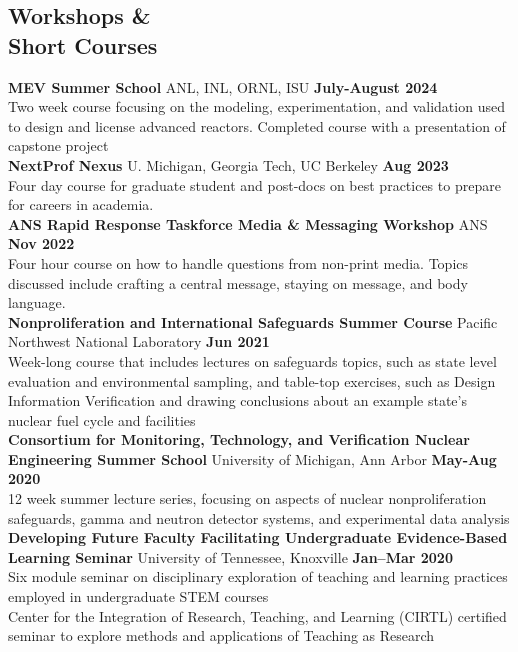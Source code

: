 \documentclass[margin,line]{resume}
\begin{document}
\begin{resume}
    \section{\mysidestyle Workshops \&\\Short Courses}
    \textbf{MEV Summer School} ANL, INL, ORNL, ISU \hfill \textbf{July-August 2024}\\
    Two week course focusing on the modeling, experimentation, and 
    validation used to design and license advanced reactors. Completed 
    course with a presentation of capstone project \\
    \textbf{NextProf Nexus} 
    U. Michigan, Georgia Tech, UC Berkeley \hfill \textbf{Aug 2023}\\
    Four day course for graduate student and post-docs on best practices to prepare for careers in 
    academia. \\
    \textbf{ANS Rapid Response Taskforce Media \& Messaging Workshop} 
    ANS \hfill \textbf{Nov 2022}\\
    Four hour course on how to handle questions from non-print media. Topics discussed 
    include crafting a central message, staying on message, and body language. \\
    \textbf{Nonproliferation and International Safeguards Summer Course} 
    Pacific Northwest National Laboratory \hfill \textbf{Jun 2021} \\
    Week-long course that includes lectures on safeguards topics, such as state level evaluation and environmental sampling, and 
    table-top exercises, such as Design Information Verification and drawing conclusions about an example state's nuclear 
    fuel cycle and facilities \\
    \textbf{Consortium for Monitoring, Technology, and Verification Nuclear Engineering Summer School} 
    University of Michigan, Ann Arbor \hfill \textbf{May-Aug 2020} \\
    12 week summer lecture series, focusing on aspects of nuclear nonproliferation safeguards, gamma and neutron detector systems, and experimental data analysis \\
    \textbf{Developing Future Faculty Facilitating Undergraduate Evidence-Based Learning Seminar} 
    University of Tennessee, Knoxville \hfill \textbf{Jan--Mar 2020} \\
    Six module seminar on disciplinary exploration of teaching and learning practices employed in undergraduate STEM courses \\
    Center for the Integration of Research, Teaching, and Learning (CIRTL) certified seminar to explore methods and applications of Teaching as Research\\

\end{resume}
\end{document}
